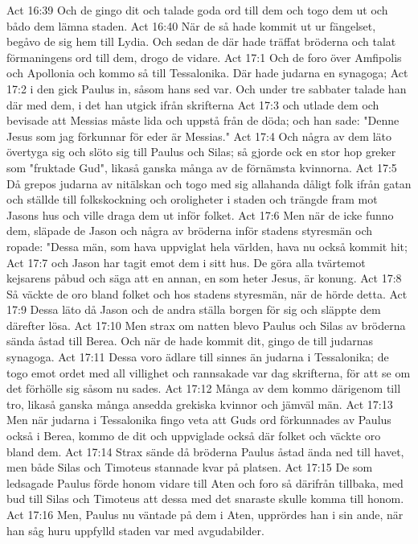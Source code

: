 Act 16:39  Och de gingo dit och talade goda ord till dem och togo dem ut och bådo dem lämna staden.
Act 16:40  När de så hade kommit ut ur fängelset, begåvo de sig hem till Lydia. Och sedan de där hade träffat bröderna och talat förmaningens ord till dem, drogo de vidare.
Act 17:1  Och de foro över Amfipolis och Apollonia och kommo så till Tessalonika. Där hade judarna en synagoga;
Act 17:2  i den gick Paulus in, såsom hans sed var. Och under tre sabbater talade han där med dem, i det han utgick ifrån skrifterna
Act 17:3  och utlade dem och bevisade att Messias måste lida och uppstå från de döda; och han sade: "Denne Jesus som jag förkunnar för eder är Messias."
Act 17:4  Och några av dem läto övertyga sig och slöto sig till Paulus och Silas; så gjorde ock en stor hop greker som "fruktade Gud", likaså ganska många av de förnämsta kvinnorna.
Act 17:5  Då grepos judarna av nitälskan och togo med sig allahanda dåligt folk ifrån gatan och ställde till folkskockning och oroligheter i staden och trängde fram mot Jasons hus och ville draga dem ut inför folket.
Act 17:6  Men när de icke funno dem, släpade de Jason och några av bröderna inför stadens styresmän och ropade: "Dessa män, som hava uppviglat hela världen, hava nu också kommit hit;
Act 17:7  och Jason har tagit emot dem i sitt hus. De göra alla tvärtemot kejsarens påbud och säga att en annan, en som heter Jesus, är konung.
Act 17:8  Så väckte de oro bland folket och hos stadens styresmän, när de hörde detta.
Act 17:9  Dessa läto då Jason och de andra ställa borgen för sig och släppte dem därefter lösa.
Act 17:10  Men strax om natten blevo Paulus och Silas av bröderna sända åstad till Berea. Och när de hade kommit dit, gingo de till judarnas synagoga.
Act 17:11  Dessa voro ädlare till sinnes än judarna i Tessalonika; de togo emot ordet med all villighet och rannsakade var dag skrifterna, för att se om det förhölle sig såsom nu sades.
Act 17:12  Många av dem kommo därigenom till tro, likaså ganska många ansedda grekiska kvinnor och jämväl män.
Act 17:13  Men när judarna i Tessalonika fingo veta att Guds ord förkunnades av Paulus också i Berea, kommo de dit och uppviglade också där folket och väckte oro bland dem.
Act 17:14  Strax sände då bröderna Paulus åstad ända ned till havet, men både Silas och Timoteus stannade kvar på platsen.
Act 17:15  De som ledsagade Paulus förde honom vidare till Aten och foro så därifrån tillbaka, med bud till Silas och Timoteus att dessa med det snaraste skulle komma till honom.
Act 17:16  Men, Paulus nu väntade på dem i Aten, upprördes han i sin ande, när han såg huru uppfylld staden var med avgudabilder.
